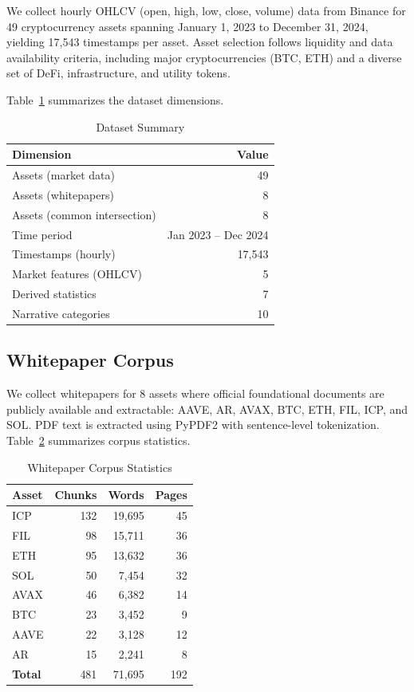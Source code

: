 \documentclass[11pt,twocolumn]{article}
\begin{document}
We collect hourly OHLCV (open, high, low, close, volume) data from Binance for 49 cryptocurrency assets spanning January 1, 2023 to December 31, 2024, yielding 17,543 timestamps per asset. Asset selection follows liquidity and data availability criteria, including major cryptocurrencies (BTC, ETH) and a diverse set of DeFi, infrastructure, and utility tokens.

Table~\ref{tab:data_summary} summarizes the dataset dimensions.

\begin{table}[H]
\centering
\caption{Dataset Summary}
\label{tab:data_summary}
\begin{tabular}{@{}lr@{}}
\toprule
\textbf{Dimension} & \textbf{Value} \\
\midrule
Assets (market data) & 49 \\
Assets (whitepapers) & 8 \\
Assets (common intersection) & 8 \\
Time period & Jan 2023 -- Dec 2024 \\
Timestamps (hourly) & 17,543 \\
Market features (OHLCV) & 5 \\
Derived statistics & 7 \\
Narrative categories & 10 \\
\bottomrule
\end{tabular}
\end{table}

\subsection{Whitepaper Corpus}

We collect whitepapers for 8 assets where official foundational documents are publicly available and extractable: AAVE, AR, AVAX, BTC, ETH, FIL, ICP, and SOL. PDF text is extracted using PyPDF2 with sentence-level tokenization. Table~\ref{tab:whitepaper_corpus} summarizes corpus statistics.

\begin{table}[H]
\centering
\caption{Whitepaper Corpus Statistics}
\label{tab:whitepaper_corpus}
\begin{tabular}{@{}lrrr@{}}
\toprule
\textbf{Asset} & \textbf{Chunks} & \textbf{Words} & \textbf{Pages} \\
\midrule
ICP & 132 & 19,695 & 45 \\
FIL & 98 & 15,711 & 36 \\
ETH & 95 & 13,632 & 36 \\
SOL & 50 & 7,454 & 32 \\
AVAX & 46 & 6,382 & 14 \\
BTC & 23 & 3,452 & 9 \\
AAVE & 22 & 3,128 & 12 \\
AR & 15 & 2,241 & 8 \\
\midrule
\textbf{Total} & 481 & 71,695 & 192 \\
\bottomrule
\end{tabular}
\end{table}
\end{document}
